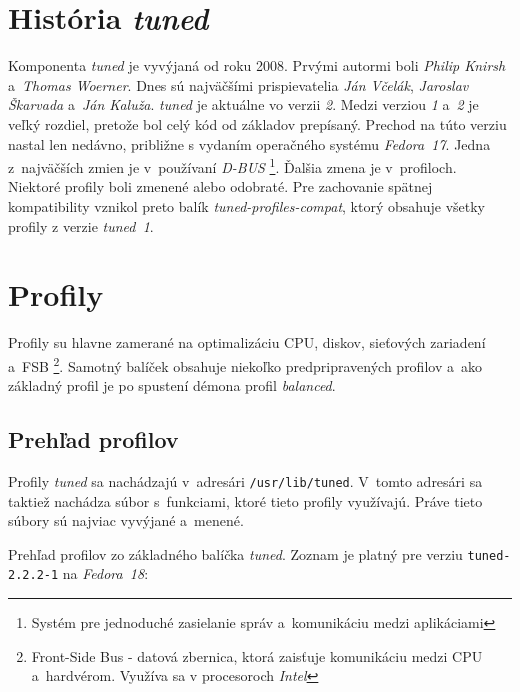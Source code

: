%
%

\section{História \emph{tuned}}
\label{sec:historiaTuned}

Komponenta \emph{tuned} je vyvýjaná od roku 2008. Prvými autormi boli
\emph{Philip Knirsh} a~\emph{Thomas Woerner}. Dnes sú najväčšími prispievatelia
\emph{Ján Včelák}, \emph{Jaroslav Škarvada} a~\emph{Ján Kaluža}.  \emph{tuned}
je aktuálne vo verzii \emph{2}. Medzi verziou \emph{1} a~\emph{2} je veľký
rozdiel, pretože bol celý kód od základov prepísaný. Prechod na túto verziu
nastal len nedávno, približne s vydaním operačného systému \emph{Fedora~17}.
Jedna z~najväčších zmien je v~používaní \emph{D-BUS} \footnote{Systém pre
jednoduché zasielanie správ a~komunikáciu medzi aplikáciami}. Ďalšia zmena je
v~profiloch. Niektoré profily boli zmenené alebo odobraté. Pre zachovanie
spätnej kompatibility vznikol preto balík \emph{tuned-profiles-compat}, ktorý
obsahuje všetky profily z verzie \emph{tuned~1}.

%
%

\section{Profily}
\label{sec:profiles}

Profily su hlavne zamerané na optimalizáciu CPU, diskov, sieťových zariadení
a~FSB \footnote{Front-Side Bus - datová zbernica, ktorá zaisťuje komunikáciu
medzi CPU a~hardvérom. Využíva sa v procesoroch \emph{Intel}}. Samotný balíček
obsahuje niekoľko predpripravených profilov a~ako základný profil je po spustení
démona profil \emph{balanced}.

%
%

\subsection{Prehľad profilov}
\label{sec:prehladProfilov}

Profily \emph{tuned} sa nachádzajú v~adresári \texttt{/usr/lib/tuned}. V~tomto
adresári sa taktiež nachádza súbor s~funkciami, ktoré tieto profily využívajú.
Práve tieto súbory sú najviac vyvýjané a~menené.

Prehľad profilov zo základného balíčka \emph{tuned}. Zoznam je platný pre
verziu \texttt{tuned-2.2.2-1} na \emph{Fedora~18}:

